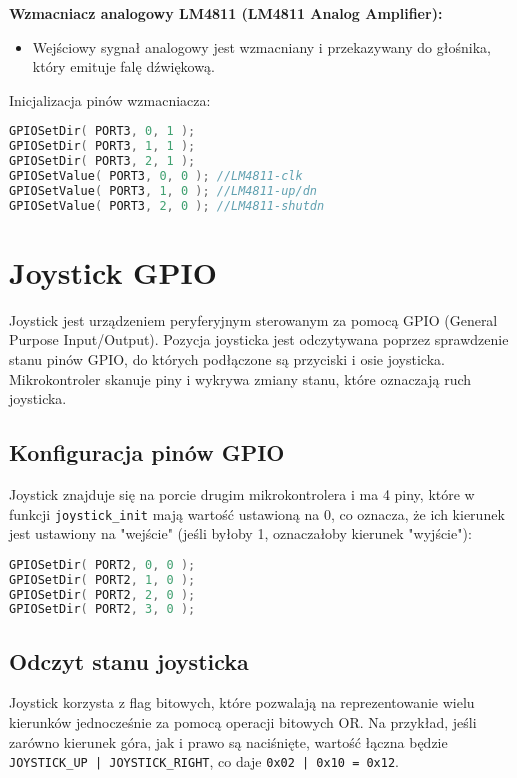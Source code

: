 \documentclass[a4paper,12pt]{report}
\begin{document}
\textbf{Wzmacniacz analogowy LM4811 (LM4811 Analog Amplifier):}
\begin{itemize}
    \item Wejściowy sygnał analogowy jest wzmacniany i przekazywany do głośnika, który emituje falę dźwiękową.
\end{itemize}

Inicjalizacja pinów wzmacniacza:
\begin{lstlisting}[language=C]
GPIOSetDir( PORT3, 0, 1 );
GPIOSetDir( PORT3, 1, 1 );
GPIOSetDir( PORT3, 2, 1 );
GPIOSetValue( PORT3, 0, 0 ); //LM4811-clk
GPIOSetValue( PORT3, 1, 0 ); //LM4811-up/dn
GPIOSetValue( PORT3, 2, 0 ); //LM4811-shutdn
\end{lstlisting}

\section{Joystick GPIO}

Joystick jest urządzeniem peryferyjnym sterowanym za pomocą GPIO (General Purpose Input/Output). Pozycja joysticka jest odczytywana poprzez sprawdzenie stanu pinów GPIO, do których podłączone są przyciski i osie joysticka. Mikrokontroler skanuje piny i wykrywa zmiany stanu, które oznaczają ruch joysticka.

\subsection*{Konfiguracja pinów GPIO}

Joystick znajduje się na porcie drugim mikrokontrolera i ma 4 piny, które w funkcji \texttt{joystick\_init} mają wartość ustawioną na 0, co oznacza, że ich kierunek jest ustawiony na "wejście" (jeśli byłoby 1, oznaczałoby kierunek "wyjście"):
\begin{lstlisting}[language=C]
GPIOSetDir( PORT2, 0, 0 );
GPIOSetDir( PORT2, 1, 0 );
GPIOSetDir( PORT2, 2, 0 );
GPIOSetDir( PORT2, 3, 0 );
\end{lstlisting}

\subsection*{Odczyt stanu joysticka}

Joystick korzysta z flag bitowych, które pozwalają na reprezentowanie wielu kierunków jednocześnie za pomocą operacji bitowych OR. Na przykład, jeśli zarówno kierunek góra, jak i prawo są naciśnięte, wartość łączna będzie \texttt{JOYSTICK\_UP | JOYSTICK\_RIGHT}, co daje \texttt{0x02 | 0x10 = 0x12}.
\end{document}
